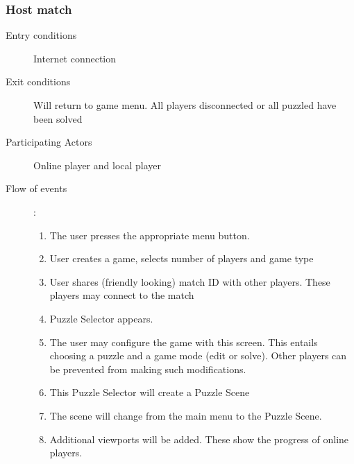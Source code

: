 \documentclass[12pt]{article}
\begin{document}
    \subsubsection{Host match}
    \begin{description}
        \item[Entry conditions] Internet connection
        \item[Exit conditions] Will return to game menu. All players
            disconnected or all puzzled have been solved
        \item[Participating Actors] Online player and local player
        \item[Flow of events]:
            \begin{enumerate}
                \item The user presses the appropriate menu button.
                \item User creates a game, selects number of players and game
                    type
                \item User shares (friendly looking) match ID with other
                    players. These players may connect to the match
                \item Puzzle Selector appears.
                \item The user may configure the game with this screen.
                    This
                    entails choosing a puzzle and a game mode (edit or solve).
                    Other players can be prevented from making such
                    modifications.
                \item This Puzzle Selector will create a Puzzle Scene
                \item The scene will change from the main menu to the Puzzle
                    Scene.
                \item Additional viewports will be added. These show the
                    progress of online players.

            \end{enumerate}
    \end{description}

\end{document}
